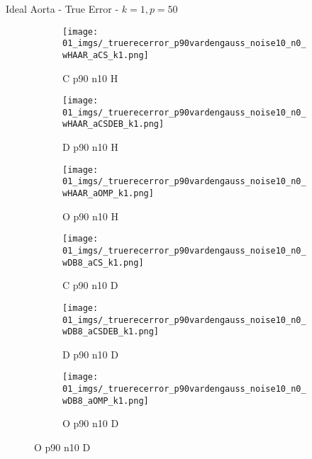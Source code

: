 \begin{frame}{Ideal Aorta - True Error - $k=1,p=50$}{}
\begin{figure}
\begin{subfigure}{0.13\textwidth}
\texttt{[image: 01\_imgs/\_truerecerror\_p90vardengauss\_noise10\_n0\_wHAAR\_aCS\_k1.png]}
\caption*{\tiny C p90 n10 H}
\end{subfigure}
\begin{subfigure}{0.13\textwidth}
\texttt{[image: 01\_imgs/\_truerecerror\_p90vardengauss\_noise10\_n0\_wHAAR\_aCSDEB\_k1.png]}
\caption*{\tiny D p90 n10 H}
\end{subfigure}
\begin{subfigure}{0.13\textwidth}
\texttt{[image: 01\_imgs/\_truerecerror\_p90vardengauss\_noise10\_n0\_wHAAR\_aOMP\_k1.png]}
\caption*{\tiny O p90 n10 H}
\end{subfigure}
\begin{subfigure}{0.13\textwidth}
\texttt{[image: 01\_imgs/\_truerecerror\_p90vardengauss\_noise10\_n0\_wDB8\_aCS\_k1.png]}
\caption*{\tiny C p90 n10 D}
\end{subfigure}
\begin{subfigure}{0.13\textwidth}
\texttt{[image: 01\_imgs/\_truerecerror\_p90vardengauss\_noise10\_n0\_wDB8\_aCSDEB\_k1.png]}
\caption*{\tiny D p90 n10 D}
\end{subfigure}
\begin{subfigure}{0.13\textwidth}
\texttt{[image: 01\_imgs/\_truerecerror\_p90vardengauss\_noise10\_n0\_wDB8\_aOMP\_k1.png]}
\caption*{\tiny O p90 n10 D}
\end{subfigure}

\vspace{5pt}


\end{figure}
\end{frame}
